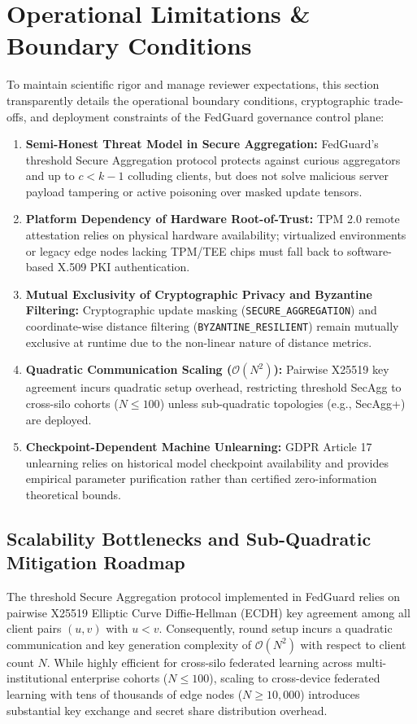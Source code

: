 \section{Operational Limitations \& Boundary Conditions}
\label{sec:limitations}

To maintain scientific rigor and manage reviewer expectations, this section transparently details the operational boundary conditions, cryptographic trade-offs, and deployment constraints of the FedGuard governance control plane:

\begin{enumerate}
    \item \textbf{Semi-Honest Threat Model in Secure Aggregation:} FedGuard's threshold Secure Aggregation protocol protects against curious aggregators and up to $c < k - 1$ colluding clients, but does not solve malicious server payload tampering or active poisoning over masked update tensors.
    \item \textbf{Platform Dependency of Hardware Root-of-Trust:} TPM 2.0 remote attestation relies on physical hardware availability; virtualized environments or legacy edge nodes lacking TPM/TEE chips must fall back to software-based X.509 PKI authentication.
    \item \textbf{Mutual Exclusivity of Cryptographic Privacy and Byzantine Filtering:} Cryptographic update masking (\texttt{SECURE\_AGGREGATION}) and coordinate-wise distance filtering (\texttt{BYZANTINE\_RESILIENT}) remain mutually exclusive at runtime due to the non-linear nature of distance metrics.
    \item \textbf{Quadratic Communication Scaling ($\mathcal{O}(N^2)$):} Pairwise X25519 key agreement incurs quadratic setup overhead, restricting threshold SecAgg to cross-silo cohorts ($N \le 100$) unless sub-quadratic topologies (e.g., SecAgg+) are deployed.
    \item \textbf{Checkpoint-Dependent Machine Unlearning:} GDPR Article 17 unlearning relies on historical model checkpoint availability and provides empirical parameter purification rather than certified zero-information theoretical bounds.
\end{enumerate}

\subsection{Scalability Bottlenecks and Sub-Quadratic Mitigation Roadmap}

The threshold Secure Aggregation protocol implemented in FedGuard relies on pairwise X25519 Elliptic Curve Diffie-Hellman (ECDH) key agreement among all client pairs $(u, v)$ with $u < v$. Consequently, round setup incurs a quadratic communication and key generation complexity of $\mathcal{O}(N^2)$ with respect to client count $N$. While highly efficient for cross-silo federated learning across multi-institutional enterprise cohorts ($N \le 100$), scaling to cross-device federated learning with tens of thousands of edge nodes ($N \ge 10,000$) introduces substantial key exchange and secret share distribution overhead.

